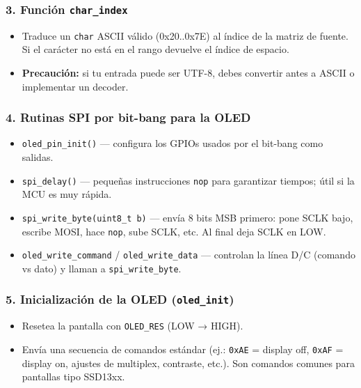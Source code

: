 \documentclass[a4paper,12pt]{article}
\begin{document}
\subsubsection*{3. Función \texttt{char\_index}}
\begin{itemize}
  \item Traduce un \texttt{char} ASCII válido (0x20..0x7E) al índice de la matriz de fuente. Si el carácter no está en el rango devuelve el índice de espacio.
  \item \textbf{Precaución:} si tu entrada puede ser UTF-8, debes convertir antes a ASCII o implementar un decoder.
\end{itemize}

\subsubsection*{4. Rutinas SPI por bit-bang para la OLED}
\begin{itemize}
  \item \texttt{oled\_pin\_init()} — configura los GPIOs usados por el bit-bang como salidas.
  \item \texttt{spi\_delay()} — pequeñas instrucciones \texttt{nop} para garantizar tiempos; útil si la MCU es muy rápida.
  \item \texttt{spi\_write\_byte(uint8\_t b)} — envía 8 bits MSB primero: pone SCLK bajo, escribe MOSI, hace \texttt{nop}, sube SCLK, etc. Al final deja SCLK en LOW.
  \item \texttt{oled\_write\_command} / \texttt{oled\_write\_data} — controlan la línea D/C (comando vs dato) y llaman a \texttt{spi\_write\_byte}.
  
\end{itemize}

\subsubsection*{5. Inicialización de la OLED (\texttt{oled\_init})}
\begin{itemize}
  \item Resetea la pantalla con \texttt{OLED\_RES} (LOW → HIGH).
  \item Envía una secuencia de comandos estándar (ej.: \texttt{0xAE} = display off, \texttt{0xAF} = display on, ajustes de multiplex, contraste, etc.). Son comandos comunes para pantallas tipo SSD13xx.
\end{itemize}
\end{document}
